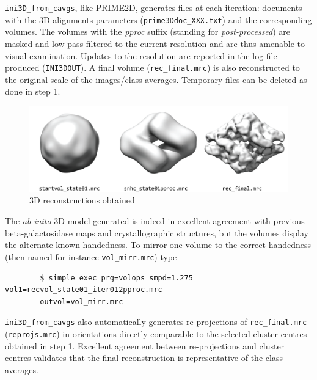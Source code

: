 \documentclass[a4paper,11pt]{article}
\begin{document}
\texttt{ini3D\_from\_cavgs}, like PRIME2D, generates files at each iteration: documents with the 3D alignments parameters (\texttt{prime3Ddoc\_XXX.txt}) and the corresponding volumes. The volumes with the \textit{pproc} suffix (standing for \textit{post-processed}) are masked and low-pass filtered to the current resolution and are thus amenable to visual examination. Updates to the resolution are reported in the log file produced (\texttt{INI3DOUT}). A final volume (\texttt{rec\_final.mrc}) is also reconstructed to the original scale of the images/class averages. Temporary files can be deleted as done in step 1.
\begin{figure}
\includegraphics[keepaspectratio=true,scale=0.6]{./bgal/bgal_maps}
\caption{3D reconstructions obtained}
\end{figure}
The \textit{ab inito} 3D model generated is indeed in excellent agreement with previous beta-galactosidase maps and crystallographic structures, but the volumes display the alternate known handedness. To mirror one volume to the correct handedness (then named for instance \texttt{vol\_mirr.mrc}) type
\begin{verbatim}
        $ simple_exec prg=volops smpd=1.275 vol1=recvol_state01_iter012pproc.mrc 
        outvol=vol_mirr.mrc
\end{verbatim}
\texttt{ini3D\_from\_cavgs} also automatically generates re-projections of \texttt{rec\_final.mrc} (\texttt{reprojs.mrc}) in orientations directly comparable to the selected cluster centres obtained in step 1. Excellent agreement between re-projections and cluster centres validates that the final reconstruction is representative of the class averages.
\end{document}

